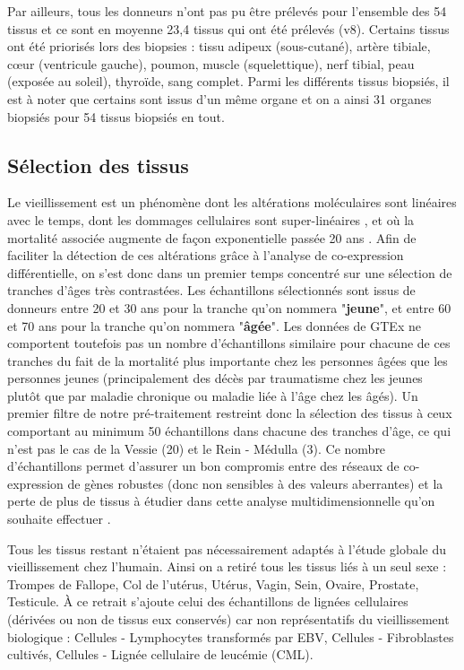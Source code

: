 Par ailleurs, tous les donneurs n'ont pas pu être prélevés pour l'ensemble des 54 tissus et ce sont en moyenne 23,4 tissus qui ont été prélevés (v8). Certains tissus ont été priorisés lors des biopsies : tissu adipeux (sous-cutané), artère tibiale, cœur (ventricule gauche), poumon, muscle (squelettique), nerf tibial, peau (exposée au soleil), thyroïde, sang complet. Parmi les différents tissus biopsiés, il est à noter que certains sont issus d'un même organe et on a ainsi 31 organes biopsiés pour 54 tissus biopsiés en tout.



\subsection{Sélection des tissus}

Le vieillissement est un phénomène dont les altérations moléculaires sont linéaires avec le temps, dont les dommages cellulaires sont super-linéaires , et où la mortalité associée augmente de façon exponentielle passée 20 ans . Afin de faciliter la détection de ces altérations grâce à l'analyse de co-expression différentielle, on s'est donc dans un premier temps concentré sur une sélection de tranches d'âges très contrastées. Les échantillons sélectionnés sont issus de donneurs entre 20 et 30 ans pour la tranche qu'on nommera "\textbf{jeune}", et entre 60 et 70 ans pour la tranche qu'on nommera "\textbf{âgée}". Les données de GTEx ne comportent toutefois pas un nombre d'échantillons similaire pour chacune de ces tranches du fait de la mortalité plus importante chez les personnes âgées que les personnes jeunes (principalement des décès par traumatisme chez les jeunes plutôt que par maladie chronique ou maladie liée à l'âge chez les âgés). Un premier filtre de notre pré-traitement restreint donc la sélection des tissus à ceux comportant au minimum 50 échantillons dans chacune des tranches d'âge, ce qui n'est pas le cas de la Vessie (20) et le Rein - Médulla (3). Ce nombre d'échantillons permet d'assurer un bon compromis entre des réseaux de co-expression de gènes robustes (donc non sensibles à des valeurs aberrantes) et la perte de plus de tissus à étudier dans cette analyse multidimensionnelle qu'on souhaite effectuer .

Tous les tissus restant n'étaient pas nécessairement adaptés à l'étude globale du vieillissement chez l'humain. Ainsi on a retiré tous les tissus liés à un seul sexe : Trompes de Fallope, Col de l'utérus, Utérus, Vagin, Sein, Ovaire, Prostate, Testicule. À ce retrait s'ajoute celui des échantillons de lignées cellulaires (dérivées ou non de tissus eux conservés) car non représentatifs du vieillissement biologique : Cellules - Lymphocytes transformés par EBV, Cellules - Fibroblastes cultivés, Cellules - Lignée cellulaire de leucémie (CML). 


